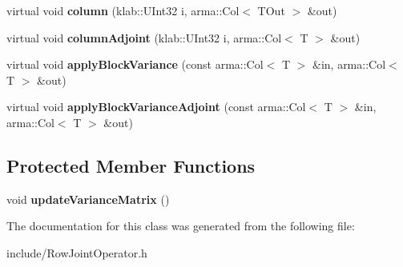 \begin{DoxyCompactItemize}
\item 
virtual void {\bfseries column} (klab\+::\+U\+Int32 i, arma\+::\+Col$<$ T\+Out $>$ \&out)\hypertarget{classkl1p_1_1TRowJointOperator_a18b6786a9e396c9e564ba5b963cf86e3}{}\label{classkl1p_1_1TRowJointOperator_a18b6786a9e396c9e564ba5b963cf86e3}

\item 
virtual void {\bfseries column\+Adjoint} (klab\+::\+U\+Int32 i, arma\+::\+Col$<$ T $>$ \&out)\hypertarget{classkl1p_1_1TRowJointOperator_a65143e473496840a1d514f7be784f77a}{}\label{classkl1p_1_1TRowJointOperator_a65143e473496840a1d514f7be784f77a}

\item 
virtual void {\bfseries apply\+Block\+Variance} (const arma\+::\+Col$<$ T $>$ \&in, arma\+::\+Col$<$ T $>$ \&out)\hypertarget{classkl1p_1_1TRowJointOperator_a8d6393cac7e2665402b5f6a08f637a63}{}\label{classkl1p_1_1TRowJointOperator_a8d6393cac7e2665402b5f6a08f637a63}

\item 
virtual void {\bfseries apply\+Block\+Variance\+Adjoint} (const arma\+::\+Col$<$ T $>$ \&in, arma\+::\+Col$<$ T $>$ \&out)\hypertarget{classkl1p_1_1TRowJointOperator_a34aa4ccd03c38ab900a7e1d6dcffbac8}{}\label{classkl1p_1_1TRowJointOperator_a34aa4ccd03c38ab900a7e1d6dcffbac8}

\end{DoxyCompactItemize}
\subsection*{Protected Member Functions}
\begin{DoxyCompactItemize}
\item 
void {\bfseries update\+Variance\+Matrix} ()\hypertarget{classkl1p_1_1TRowJointOperator_ad999b25e598441216b86c8525cd91337}{}\label{classkl1p_1_1TRowJointOperator_ad999b25e598441216b86c8525cd91337}

\end{DoxyCompactItemize}


The documentation for this class was generated from the following file\+:\begin{DoxyCompactItemize}
\item 
include/Row\+Joint\+Operator.\+h\end{DoxyCompactItemize}
